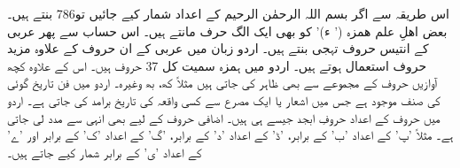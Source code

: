 \documentclass[a4paper]{article}
\begin{document}
\begin{flushright}
اس طریقہ سے اگر بسم اللہ الرحمٰن الرحیم کے اعداد شمار کیے جائیں تو786 بنتے ہیں۔ بعض اھلِ علم ھمزہ (' ء)' کو بھی ایک الگ حرف مانتے ہیں۔ اس حساب سے پھر عربی کے انتیس حروف تہجی بنتے ہیں۔ اردو زبان میں عربی کے ان حروف کے علاوہ مزید حروف استعمال ہوتے ہیں۔ اردو میں ہمزہ سمیت کل 37 حروف ہیں۔ اس کے علاوہ کچھ آوازیں حروف کے مجموعے سے بھی ظاہر کی جاتی ہیں مثلاً کھ، بھ وغیرہ۔ اردو میں فن تاریخ گوئی کی صنف موجود ہے جس میں اشعار یا ایک مصرع سے کسی واقعہ کی تاریخ برامد کی جاتی ہے۔ اردو میں حروف کے اعداد حروفِ ابجد جیسے ہی ہیں۔ اضافی حروف کے لیے بھی انہی سے مدد لی جاتی ہے۔ مثلاً 'پ' کے اعداد 'ب' کے برابر، 'ڈ' کے اعداد 'د' کے برابر، 'گ' کے اعداد 'ک' کے برابر اور 'ے' کے اعداد 'ی' کے برابر شمار کیے جاتے ہیں۔



\end{flushright}
\end{document}
